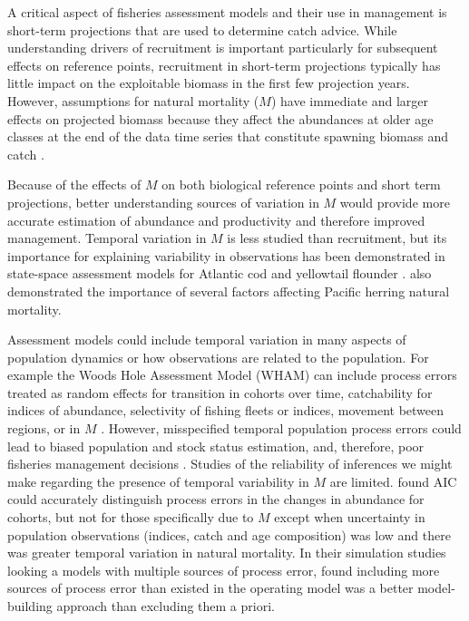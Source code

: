 \documentclass[
  12pt,
]{article}
\begin{document}
A critical aspect of fisheries assessment models and their use in management is short-term projections that are used to determine catch advice. While understanding drivers of recruitment is important particularly for subsequent effects on reference points, recruitment in short-term projections typically has little impact on the exploitable biomass in the first few projection years. However, assumptions for natural mortality (\(M\)) have immediate and larger effects on projected biomass because they affect the abundances at older age classes at the end of the data time series that constitute spawning biomass and catch \citep{brodziaketal08, stocketal21}.

Because of the effects of \(M\) on both biological reference points and short term projections, better understanding sources of variation in \(M\) would provide more accurate estimation of abundance and productivity and therefore improved management. Temporal variation in \(M\) is less studied than recruitment, but its importance for explaining variability in observations has been demonstrated in state-space assessment models for Atlantic cod and yellowtail flounder \citep{cadigan16, stocketal21}. \citet{derisoetal08} also demonstrated the importance of several factors affecting Pacific herring natural mortality.

Assessment models could include temporal variation in many aspects of population dynamics or how observations are related to the population. For example the Woods Hole Assessment Model (WHAM) can include process errors treated as random effects for transition in cohorts over time, catchability for indices of abundance, selectivity of fishing fleets or indices, movement between regions, or in \(M\) \citep{stockmiller21, milleretal_inreview}. However, misspecified temporal population process errors could lead to biased population and stock status estimation, and, therefore, poor fisheries management decisions \citep{legaultpalmer16, szuwalskietal18}. Studies of the reliability of inferences we might make regarding the presence of temporal variability in \(M\) are limited. \citet{milleretal_inreview1} found AIC could accurately distinguish process errors in the changes in abundance for cohorts, but not for those specifically due to \(M\) except when uncertainty in population observations (indices, catch and age composition) was low and there was greater temporal variation in natural mortality. In their simulation studies looking a models with multiple sources of process error, \citet{lietal24} found including more sources of process error than existed in the operating model was a better model-building approach than excluding them a priori.
\end{document}
